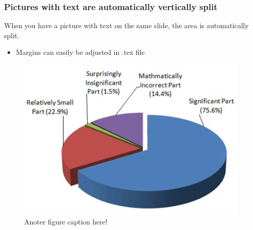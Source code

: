 \documentclass{beamer}
\begin{document}
\begin{frame}
    \frametitle{Pictures with text are automatically vertically split}

	\begin{minipage}{0.4\textwidth}
When you have a picture with text on the same slide, the area is automatically split.
\begin{itemize}
\item Margins can easily be adjusted in .tex file

\end{itemize}

	\end{minipage}%
	\hfill
	\begin{minipage}{0.55\textwidth}

    \begin{figure}
        \centering
        \includegraphics[width=\textwidth]{./figs/pie_chart.jpg}
        \caption{Anoter figure caption here!}
    \end{figure}	\end{minipage}

\end{frame}
\end{document}
